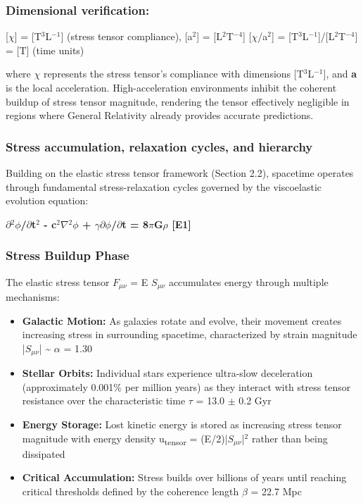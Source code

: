 \documentclass[11pt,a4paper]{article}
\begin{document}
\begin{mdframed}[linecolor=accent,linewidth=0.5pt,backgroundcolor=callout-bg,leftline=true,rightline=true,topline=true,bottomline=true,innerleftmargin=8pt,innerrightmargin=8pt,innertopmargin=6pt,innerbottommargin=6pt]
\subsubsection{Dimensional verification:}
[$\chi$] = [T$^{3}$L$^{-1}$] (stress tensor compliance), [a$^{2}$] = [L$^{2}$T$^{-4}$]\newline{}
[$\chi$/a$^{2}$] = [T$^{3}$L$^{-1}$]/[L$^{2}$T$^{-4}$] = [T] \checkmark{} (time units)
\end{mdframed}

where \textbf{$\chi$} represents the stress tensor's compliance with dimensions [T$^{3}$L$^{-1}$], and \textbf{a} is the local acceleration. High-acceleration environments inhibit the coherent buildup of stress tensor magnitude, rendering the tensor effectively negligible in regions where General Relativity already provides accurate predictions.

\subsubsection{Stress accumulation, relaxation cycles, and hierarchy}
Building on the elastic stress tensor framework (Section 2.2), spacetime operates through fundamental stress-relaxation cycles governed by the viscoelastic evolution equation:

\textbf{$\partial$$^{2}$$\phi$/$\partial$t$^{2}$ - c$^{2}$$\nabla$$^{2}$$\phi$ + $\gamma$$\partial$$\phi$/$\partial$t = 8$\pi$G$\rho$ [E1]}

\subsubsection{Stress Buildup Phase}
The elastic stress tensor $F_{\mu\nu}$ = E $S_{\mu\nu}$ accumulates energy through multiple mechanisms:

\begin{itemize}
  \item \textbf{Galactic Motion:} As galaxies rotate and evolve, their movement creates increasing stress in surrounding spacetime, characterized by strain magnitude |$S_{\mu\nu}$| \~{} $\alpha$ = 1.30
  \item \textbf{Stellar Orbits:} Individual stars experience ultra-slow deceleration (approximately 0.001\% per million years) as they interact with stress tensor resistance over the characteristic time $\tau$ = 13.0 $\pm$ 0.2 Gyr
  \item \textbf{Energy Storage:} Lost kinetic energy is stored as increasing stress tensor magnitude with energy density u\textsubscript{tensor} = (E/\allowbreak{}2)|$S_{\mu\nu}$|$^{2}$ rather than being dissipated
  \item \textbf{Critical Accumulation:} Stress builds over billions of years until reaching critical thresholds defined by the coherence length $\beta$ = 22.7 Mpc
\end{itemize}
\end{document}
